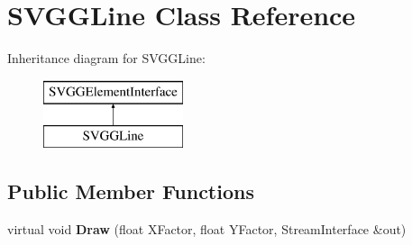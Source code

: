 \hypertarget{classSVGGLine}{
\section{SVGGLine Class Reference}
\label{classSVGGLine}
}
Inheritance diagram for SVGGLine:\begin{figure}[H]
\begin{center}
\leavevmode
\includegraphics[height=2.000000cm]{classSVGGLine}
\end{center}
\end{figure}
\subsection*{Public Member Functions}
\begin{DoxyCompactItemize}
\item 
\hypertarget{classSVGGLine_a85498ae7a7c767546299b51df4b7a284}{
virtual void {\bfseries Draw} (float XFactor, float YFactor, StreamInterface \&out)}
\label{classSVGGLine_a85498ae7a7c767546299b51df4b7a284}

\end{DoxyCompactItemize}
